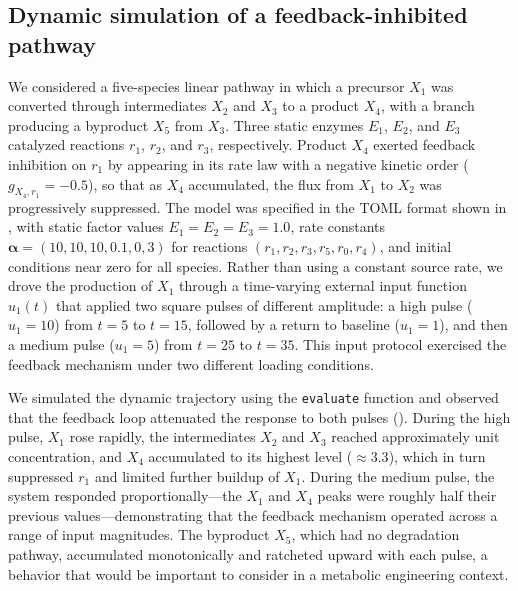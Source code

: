 \documentclass[11pt]{article}
\begin{document}
\subsection{Dynamic simulation of a feedback-inhibited pathway}\label{sec:ex-dynamic}
We considered a five-species linear pathway in which a precursor $X_1$ was converted through intermediates $X_2$ and $X_3$ to a product $X_4$, with a branch producing a byproduct $X_5$ from $X_3$. Three static enzymes $E_1$, $E_2$, and $E_3$ catalyzed reactions $r_1$, $r_2$, and $r_3$, respectively. Product $X_4$ exerted feedback inhibition on $r_1$ by appearing in its rate law with a negative kinetic order ($g_{X_4,r_1} = -0.5$), so that as $X_4$ accumulated, the flux from $X_1$ to $X_2$ was progressively suppressed. The model was specified in the TOML format shown in , with static factor values $E_1 = E_2 = E_3 = 1.0$, rate constants $\boldsymbol{\alpha} = (10, 10, 10, 0.1, 0, 3)$ for reactions $(r_1, r_2, r_3, r_5, r_0, r_4)$, and initial conditions near zero for all species. Rather than using a constant source rate, we drove the production of $X_1$ through a time-varying external input function $u_1(t)$ that applied two square pulses of different amplitude: a high pulse ($u_1 = 10$) from $t = 5$ to $t = 15$, followed by a return to baseline ($u_1 = 1$), and then a medium pulse ($u_1 = 5$) from $t = 25$ to $t = 35$. This input protocol exercised the feedback mechanism under two different loading conditions.

We simulated the dynamic trajectory using the \texttt{evaluate} function and observed that the feedback loop attenuated the response to both pulses (). During the high pulse, $X_1$ rose rapidly, the intermediates $X_2$ and $X_3$ reached approximately unit concentration, and $X_4$ accumulated to its highest level ($\approx 3.3$), which in turn suppressed $r_1$ and limited further buildup of $X_1$. During the medium pulse, the system responded proportionally---the $X_1$ and $X_4$ peaks were roughly half their previous values---demonstrating that the feedback mechanism operated across a range of input magnitudes. The byproduct $X_5$, which had no degradation pathway, accumulated monotonically and ratcheted upward with each pulse, a behavior that would be important to consider in a metabolic engineering context.
\end{document}
